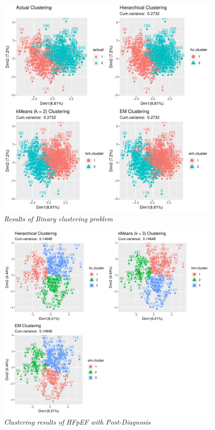 \documentclass[../thesis.tex]{subfiles}
\begin{document}
\begin{figure}[h!]
    \centering
    \hspace*{-1cm}\includegraphics[width=1.1\textwidth]{doc/thesis/images/ClustFull.pdf}
    \caption[Binary clustering problem]{\textit{Results of Binary clustering problem}}
    \label{fig:bi_clust_results}
\end{figure}

\newpage

\begin{figure}[h!]
    \centering
    \hspace*{-1cm}\includegraphics[width=1.1\textwidth]{doc/thesis/images/ClustpPhy.pdf}
    \caption[HFpEF with Post-Diagnosis]{\textit{Clustering results of HFpEF with Post-Diagnosis}}
    \label{fig:clust_results_with_post_p}
\end{figure}
\end{document}
